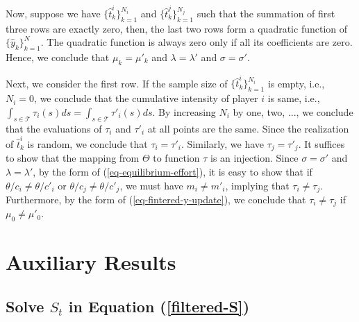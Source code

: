 \documentclass[mnsc]{informs3}
\begin{document}
\begin{APPENDICES}
Now, suppose we have $\{\hat{t}^i_k\}_{k=1}^{N_i}$ and $\{\hat{t}^j_k\}_{k=1}^{N_j}$ such that the summation of first three rows are exactly zero, then, the last two rows form a quadratic function of $\{\hat{y}_k\}_{k=1}^{N}$. 
The quadratic function is always zero only if all its coefficients are zero. 
Hence, we conclude that $\mu_k = \mu'_k$ and $\lambda = \lambda'$ and $\sigma = \sigma'$. 

Next, we consider the first row. If the sample size of $\{\hat{t}^i_k\}_{k=1}^{N_i}$ is empty, i.e., $N_i=0$, we conclude that the cumulative intensity of player $i$ is same, i.e., $\int_{s\in\mathcal{T}}\tau_i(s)ds = \int_{s\in\mathcal{T}}\tau'_i(s)ds$. 
By increasing $N_i$ by one, two, ..., we conclude that the evaluations of $\tau_i$ and $\tau'_i$ at all points are the same. 
Since the realization of $\hat{t}^i_k$ is random, we conclude that $\tau_i = \tau'_i$. 
Similarly, we have $\tau_j = \tau'_j$. 
It suffices to show that the mapping from $\Theta$ to function $\tau$ is an injection. 
Since $\sigma = \sigma'$ and $\lambda = \lambda'$, by the form of (\ref{eq-equilibrium-effort}), it is easy to show that if $\theta/c_i\not=\theta/c'_i$ or $\theta/c_j\not=\theta/c'_j$, we must have $m_i\not=m'_i$, implying that $\tau_i\not=\tau_j$. 
Furthermore, by the form of (\ref{eq-fintered-y-update}), we conclude that $\tau_i\not=\tau_j$ if $\mu_0\not=\mu'_0$. 
\Halmos
\endproof






\section{Auxiliary Results}

\subsection{Solve $S_t$ in Equation (\ref{filtered-S})}\label{app-S-equ}


\end{APPENDICES}
\end{document}
